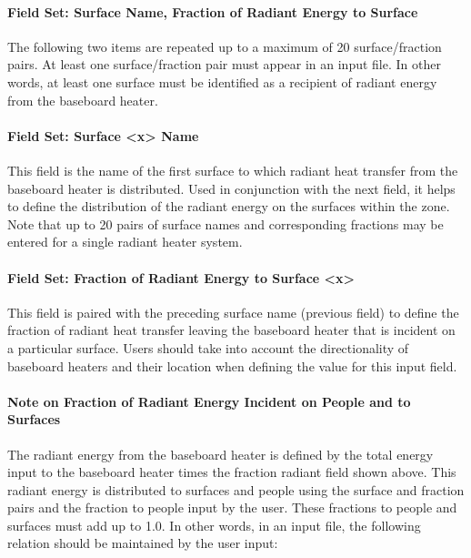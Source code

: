 \paragraph{Field Set: Surface Name, Fraction of Radiant Energy to Surface}\label{field-set-surface-name-fraction-of-radiant-energy-to-surface-2}

The following two items are repeated up to a maximum of 20 surface/fraction pairs. At least one surface/fraction pair must appear in an input file. In other words, at least one surface must be identified as a recipient of radiant energy from the baseboard heater.

\paragraph{Field Set: Surface \textless{}x\textgreater{} Name}\label{field-set-surface-x-name}

This field is the name of the first surface to which radiant heat transfer from the baseboard heater is distributed. Used in conjunction with the next field, it helps to define the distribution of the radiant energy on the surfaces within the zone. Note that up to 20 pairs of surface names and corresponding fractions may be entered for a single radiant heater system.

\paragraph{Field Set: Fraction of Radiant Energy to Surface \textless{}x\textgreater{}}\label{field-set-fraction-of-radiant-energy-to-surface-x}

This field is paired with the preceding surface name (previous field) to define the fraction of radiant heat transfer leaving the baseboard heater that is incident on a particular surface. Users should take into account the directionality of baseboard heaters and their location when defining the value for this input field.

\paragraph{Note on Fraction of Radiant Energy Incident on People and to Surfaces}\label{note-on-fraction-of-radiant-energy-incident-on-people-and-to-surfaces-1}

The radiant energy from the baseboard heater is defined by the total energy input to the baseboard heater times the fraction radiant field shown above. This radiant energy is distributed to surfaces and people using the surface and fraction pairs and the fraction to people input by the user. These fractions to people and surfaces must add up to 1.0. In other words, in an input file, the following relation should be maintained by the user input:

